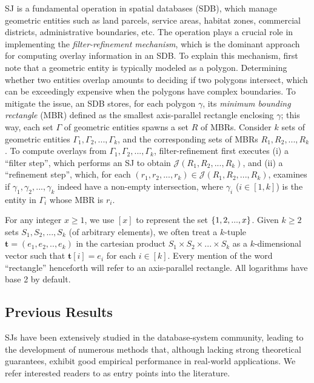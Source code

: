 \documentclass[sigconf]{acmart}
\def\vgap{\vspace{1mm}}
\def\extraspacing{\vspace{2mm} \noindent}
\def\J{\mathcal{J}}
\begin{document}
\vgap

SJ is a fundamental operation in spatial databases (SDB), which manage geometric entities such as land parcels, service areas, habitat zones, commercial districts, administrative boundaries, etc. The operation plays a crucial role in implementing the {\em filter-refinement mechanism}, which is the dominant approach for computing overlay information in an SDB. To explain this mechanism, first note that a geometric entity is typically modeled as a polygon. Determining whether two entities overlap amounts to deciding if two polygons intersect, which can be exceedingly expensive when the polygons have complex boundaries. To mitigate the issue, an SDB stores, for each polygon $\gamma$, its {\em minimum bounding rectangle} (MBR) defined as the smallest axis-parallel rectangle enclosing $\gamma$; this way, each set $\Gamma$ of geometric entities spawns a set $R$ of MBRs. Consider $k$ sets of geometric entities $\Gamma_1, \Gamma_2, ..., \Gamma_k$, and the corresponding sets of MBRs $R_1, R_2, ..., R_k$. To compute overlays from $\Gamma_1, \Gamma_2, ..., \Gamma_k$, filter-refinement first executes (i) a ``filter step'', which performs an SJ to obtain $\J(R_1, R_2, ..., R_k)$, and (ii) a ``refinement step'', which, for each $(r_1, r_2, ..., r_k) \in \J(R_1, R_2, ..., R_k)$, examines if $\gamma_1, \gamma_2, ..., \gamma_k$ indeed have a non-empty intersection, where $\gamma_i$ ($i \in [1, k]$) is the entity in $\Gamma_i$ whose MBR is $r_i$.


\extraspacing {\bf Math Conventions.} For any integer $x \ge 1$, we use $[x]$ to represent the set $\{1, 2, ..., x\}$. Given $k \ge 2$ sets $S_1, S_2, ..., S_k$ (of arbitrary elements), we often treat a $k$-tuple $\bm{t} = (e_1, e_2, .., e_k)$ in the cartesian product $S_1 \times S_2 \times ... \times S_k$ as a $k$-dimensional vector such that $\bm{t}[i] = e_i$ for each $i \in [k]$. Every mention of the word ``rectangle'' henceforth will refer to an axis-parallel rectangle. All logarithms have base 2 by default.

\subsection{Previous Results} \label{sec:intro:prev}

SJs have been extensively studied in the database-system community, leading to the development of numerous methods that, although lacking strong theoretical guarantees, exhibit good empirical performance in real-world applications. We refer interested readers to \cite{apr+00,bks93,gcn+13,js07,ks97,lr94,lr96,mp98,mp01,mp03,pd96,pmt99} as entry points into the literature.
\end{document}

